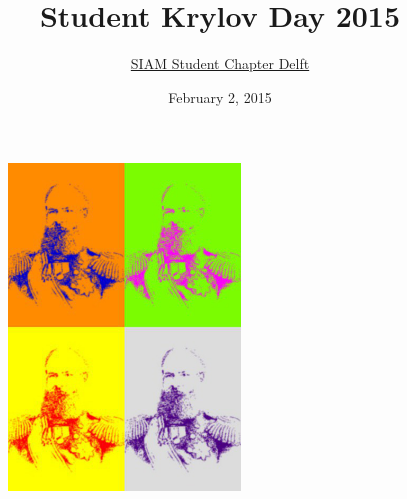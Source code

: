 \documentclass{article}
\title{\bf Student Krylov Day 2015}
\author{\href{http://sscdelft.github.io/activities/2015/02/02/krylov-day.html}{SIAM Student Chapter Delft}}
\date{February 2, 2015}
\begin{document}
\maketitle
\begin{figure}[h]
 \centering
 \includegraphics[width=0.55\textwidth]{krylov_warhol2.jpg} 
\end{figure}
\end{document}

